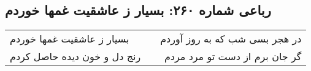 \begin{center}
\section*{رباعی شماره ۲۶۰: بسیار ز عاشقیت غمها خوردم}
\label{sec:sh260}
\begin{longtable}{l p{0.5cm} r}
بسیار ز عاشقیت غمها خوردم
&&
در هجر بسی شب که به روز آوردم
\\
رنج دل و خون دیده حاصل کردم
&&
گر جان برم از دست تو مرد مردم
\\
\end{longtable}
\end{center}
